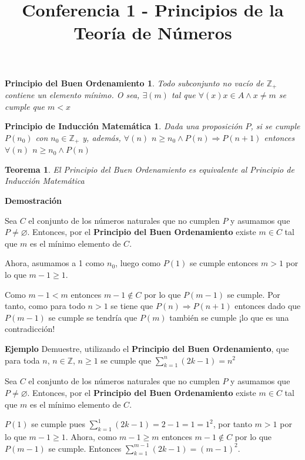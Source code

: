 \documentclass[a4paper,1pt]{report}
\title{Conferencia 1 - Principios de la Teoría de Números}
\author{}
\newtheorem*{pbo}{Principio del Buen Ordenamiento}
\newtheorem*{pim}{Principio de Inducción Matemática}
\newtheorem*{teo}{Teorema}
\begin{document}
\maketitle


\begin{pbo}

Todo subconjunto no vacío de $\mathbb{Z}_{+}$ contiene un elemento mínimo. O sea,
$\exists(m)$ tal que $\forall(x) x\in A\wedge x\neq m$ se cumple que $m<x$
\end{pbo}

\begin{pim}
 Dada una proposición $P$, si se cumple $P(n_0)$ con $n_0\in \mathbb{Z}_{+}$ y, además, 
 $\forall(n)$ $n\geq n_0\wedge P(n) \Rightarrow P(n+1)$ entonces $\forall(n)$ $n\geq n_0 \wedge P(n)$
\end{pim}

\begin{teo}
 El Principio del Buen Ordenamiento es equivalente al Principio de Inducción Matemática
\end{teo}

\textbf{Demostración}

Sea $C$ el conjunto de los números naturales que no cumplen $P$ y asumamos que $P\neq \varnothing$. Entonces, por el \textbf{Principio del Buen Ordenamiento} existe $m\in C$ tal que $m$ es el mínimo elemento de $C$.

Ahora, asumamos a 1 como $n_0$, luego como $P(1)$ se cumple entonces $m>1$ por lo que $m-1\geq 1$.

Como $m-1<m$ entonces $m-1\notin C$ por lo que $P(m-1)$ se cumple. Por tanto, como para todo $n>1$ se tiene que $P(n)\Rightarrow P(n+1)$ entonces dado que $P(m-1)$ se cumple se tendría que $P(m)$ también se cumple ¡lo que es una contradicción!

\textbf{Ejemplo}
Demuestre, utilizando el \textbf{Principio del Buen Ordenamiento}, que para toda $n$, $n\in\mathbb{Z}$, $n\geq 1$ se cumple que $\sum^n_{k=1}(2k-1)=n^2$

Sea $C$ el conjunto de los números naturales que no cumplen $P$ y asumamos que $P\neq \varnothing$. Entonces, por el \textbf{Principio del Buen Ordenamiento} existe $m\in C$ tal que $m$ es el mínimo elemento de $C$.

$P(1)$ se cumple pues $\sum^1_{k=1}(2k-1)=2-1=1=1^2$, por tanto $m>1$ por lo que $m-1\geq1$. Ahora, como $m-1\geq m$ entonces $m-1\notin C$ por lo que $P(m-1)$ se cumple. Entonces $\sum^{m-1}_{k=1}(2k-1)=(m-1)^2$.
\end{document}
